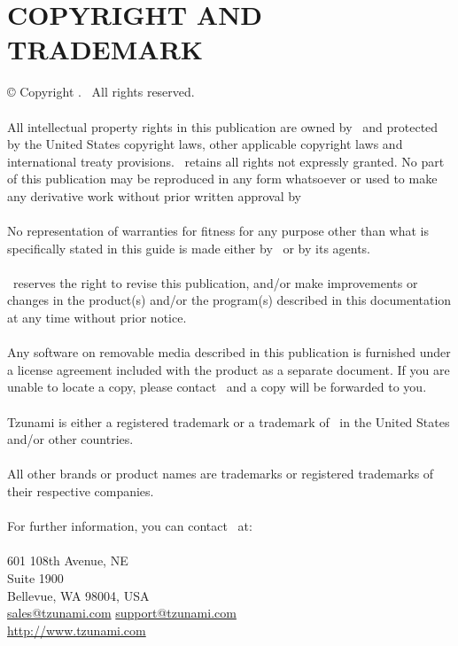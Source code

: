 \chapter{COPYRIGHT AND TRADEMARK}
© Copyright \the\year{}. \compName\ All rights reserved.\\ \\
All intellectual property rights in this publication are owned by \compName\ and protected by the United States copyright laws, other applicable copyright laws and international treaty provisions. \compName\ retains all rights not expressly granted. No part of this publication may be reproduced in any form whatsoever or used to make any derivative work without prior written approval by \compName
\\ \\
No representation of warranties for fitness for any purpose other than what is specifically stated in this guide is made either by \compName\ or by its agents.
\\ \\
\compName\ reserves the right to revise this publication, and/or make improvements or changes in the product(s) and/or the program(s) described in this documentation at any time without prior notice.
\\ \\
Any software on removable media described in this publication is furnished under a license agreement included with the product as a separate document. If you are unable to locate a copy, please contact \compName\ and a copy will be forwarded to you.
\\ \\
Tzunami is either a registered trademark or a trademark of \compName\ in the United States and/or other countries.
\\\\
All other brands or product names are trademarks or registered trademarks of their respective companies.
\\ \\
For further information, you can contact \compName\ at: 
\\
\compName \\
601 108th Avenue, NE \\
Suite 1900\\
Bellevue, WA 98004, USA\\
\href{mailto: sales@tzunami.com}{sales@tzunami.com}
\href{mailto: support@tzunami.com}{support@tzunami.com}\\
\url{http://www.tzunami.com}